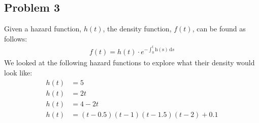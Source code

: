 \documentclass[letter]{article}
\begin{document}
\subsection*{Problem 3}
Given a hazard function, $h(t)$, the density function, $f(t)$, can be found as follows:
\begin{equation*}
  \begin{aligned}
      f(t) = h(t) \cdot e^{-\int_0^t \mathrm{h(s)}\,\mathrm{d}s}
  \end{aligned}
\end{equation*}
We looked at the following hazard functions to explore what their density would look like:
\begin{equation*}
  \begin{aligned}
      h(t) &= 5 \\
      h(t) &= 2t \\
      h(t) &= 4 - 2t  \\
      h(t) &= (t-0.5)(t-1)(t-1.5)(t-2) + 0.1\\
  \end{aligned}
\end{equation*}
\end{document}
